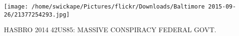 \documentclass[10pt,letterpaper]{article}
\begin{document}
\texttt{[image: /home/swickape/Pictures/flickr/Downloads/Baltimore 2015-09-26/21377254293.jpg]}

HASBRO 2014 42US85: MASSIVE CONSPIRACY FEDERAL GOVT.\\
\pagebreak
\end{document}
